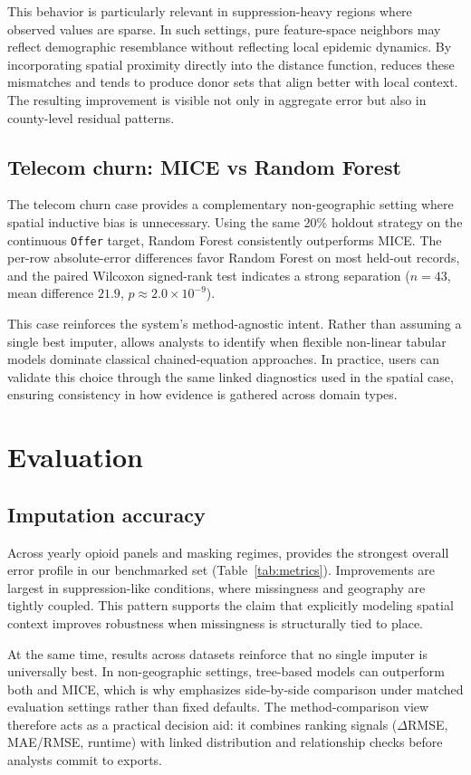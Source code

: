 This behavior is particularly relevant in suppression-heavy regions where observed values are sparse. In such settings, pure feature-space neighbors may reflect demographic resemblance without reflecting local epidemic dynamics. By incorporating spatial proximity directly into the distance function, \gknn reduces these mismatches and tends to produce donor sets that align better with local context. The resulting improvement is visible not only in aggregate error but also in county-level residual patterns.

\subsection{Telecom churn: MICE vs Random Forest}
The telecom churn case provides a complementary non-geographic setting where spatial inductive bias is unnecessary. Using the same 20\% holdout strategy on the continuous \texttt{Offer} target, Random Forest consistently outperforms MICE. The per-row absolute-error differences favor Random Forest on most held-out records, and the paired Wilcoxon signed-rank test indicates a strong separation (\(n=43\), mean difference \(21.9\), \(p\approx2.0\times10^{-9}\)).

This case reinforces the system's method-agnostic intent. Rather than assuming a single best imputer, \tool allows analysts to identify when flexible non-linear tabular models dominate classical chained-equation approaches. In practice, users can validate this choice through the same linked diagnostics used in the spatial case, ensuring consistency in how evidence is gathered across domain types.

\section{Evaluation}
\subsection{Imputation accuracy}
Across yearly opioid panels and masking regimes, \gknn provides the strongest overall error profile in our benchmarked set (Table~\ref{tab:metrics}). Improvements are largest in suppression-like conditions, where missingness and geography are tightly coupled. This pattern supports the claim that explicitly modeling spatial context improves robustness when missingness is structurally tied to place.

At the same time, results across datasets reinforce that no single imputer is universally best. In non-geographic settings, tree-based models can outperform both \gknn and MICE, which is why \tool emphasizes side-by-side comparison under matched evaluation settings rather than fixed defaults. The method-comparison view therefore acts as a practical decision aid: it combines ranking signals (\(\Delta\)RMSE, MAE/RMSE, runtime) with linked distribution and relationship checks before analysts commit to exports.


